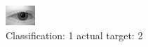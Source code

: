 \begin{figure}[h!]
\begin{center}
\includegraphics[width=0.60\columnwidth]{figures/ID470_class_1_target_2.png}
\end{center}
\caption{ Classification: 1 actual target: 2}
\label{fig:ID470_class_1_target_2}
\end{figure}
